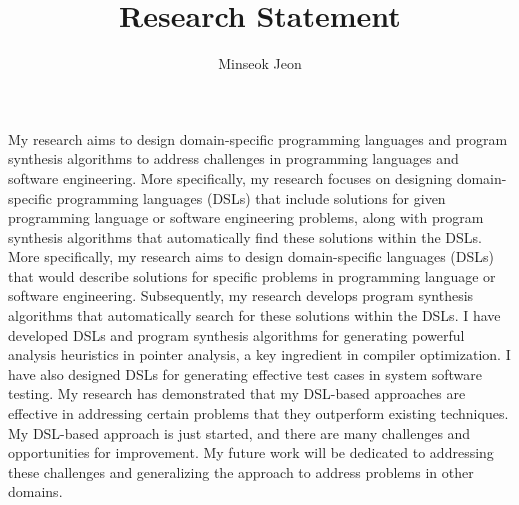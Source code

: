 \documentclass[11pt]{article}
\begin{document}
\title{Research Statement}
\author{Minseok Jeon}
\date{}


\newcommand{\DisjunctiveModel}{{``Disjunctive Model''}}
\newcommand{\FeatureLanguage}{{``Feature Language''}}
\newcommand{\GDL}{{``Graph Description Language''}}


\newcommand{\AbstractRelativeWritePattern}{{``Abstract Relative Write Pattern''}}

\maketitle 

My research aims to design domain-specific programming languages and program synthesis algorithms to address challenges in programming languages and software engineering. 
%
More specifically, my research focuses on designing domain-specific programming languages (DSLs) that include solutions for given programming language or software engineering problems, along with program synthesis algorithms that automatically find these solutions within the DSLs.
%
More specifically, my research aims to design domain-specific languages (DSLs) that would describe solutions for specific problems in programming language or software engineering. 
%
Subsequently, my research develops program synthesis algorithms that automatically search for these solutions within the DSLs.
%
I have developed DSLs and program synthesis algorithms for generating powerful analysis heuristics in pointer analysis, a key ingredient in compiler optimization.
%
I have also designed DSLs for generating effective test cases in system software testing.
%
My research has demonstrated that my DSL-based approaches are effective in addressing certain problems that they outperform existing techniques.
%
My DSL-based approach is just started, and there are many challenges and opportunities for improvement.
%
My future work will be dedicated to addressing these challenges and generalizing the approach to address problems in other domains.
\end{document}
